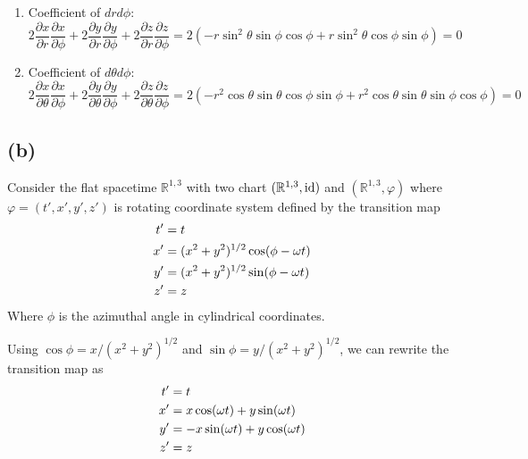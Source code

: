 \documentclass[a4paper,11pt]{article}
\begin{document}
\begin{enumerate}
\begin{equation}
    \end{equation}
    \item Coefficient of $dr d\phi$:
    \begin{equation}
        2\frac{\partial x}{\partial r}\frac{\partial x}{\partial \phi} + 2\frac{\partial y}{\partial r}\frac{\partial y}{\partial \phi} + 2\frac{\partial z}{\partial r}\frac{\partial z}{\partial \phi} = 2(-r\sin^2\theta\sin\phi\cos\phi + r\sin^2\theta\cos\phi\sin\phi) = 0
    \end{equation}
    \item Coefficient of $d\theta d\phi$:
    \begin{equation}
        2\frac{\partial x}{\partial \theta}\frac{\partial x}{\partial \phi} + 2\frac{\partial y}{\partial \theta}\frac{\partial y}{\partial \phi} + 2\frac{\partial z}{\partial \theta}\frac{\partial z}{\partial \phi} = 2(-r^2\cos\theta\sin\theta\cos\phi\sin\phi + r^2\cos\theta\sin\theta\sin\phi\cos\phi) = 0
    \end{equation}
\end{enumerate}


\subsection{(b)}



Consider the flat spacetime $\mathbb{R}^{1,3}$ with two chart $(\mathbb{R}^{1,3}, \operatorname{id})$ and $(\mathbb{R}^{1,3}, \varphi)$ where $\varphi=(t', x', y', z')$ is rotating coordinate system defined by the transition map
\begin{align}
    t' &= t \notag\\
    x' &= (x^2 + y^2)^{1/2}\cos(\phi - \omega t) \notag\\
    y' &= (x^2 + y^2)^{1/2}\sin(\phi - \omega t) \notag\\
    z' &= z
\end{align}
Where $\phi$ is the azimuthal angle in cylindrical coordinates. 

Using $\cos\phi = x/(x^2+y^2)^{1/2}$ and $\sin\phi = y/(x^2+y^2)^{1/2}$, we can rewrite the transition map as
\begin{align}
    t' &= t \notag\\
    x' &= x\cos(\omega t) + y\sin(\omega t) \notag\\
    y' &= -x\sin(\omega t) + y\cos(\omega t) \notag\\
    z' &= z
\end{align}
\end{document}
